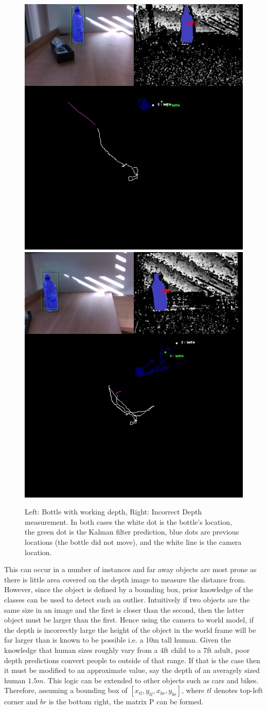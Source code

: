 \documentclass[11pt,twoside]{report}
\begin{document}
\noindent \begin{figure}[h!]
	\includegraphics[width = 0.5\hsize]{figures/bottle2.jpg}
	\includegraphics[width = 0.5\hsize]{figures/bottle1.jpg}
	\caption{Left: Bottle with working depth, Right: Incorrect Depth measurement. In both cases the white dot is the bottle's location, the green dot is the Kalman filter prediction, blue dots are previous locations (the bottle did not move), and the white line is the camera location.}
	\label{bottle}
\end{figure}

This can occur in a number of instances and far away objects are most prone as there is little area covered on the depth image to measure the distance from. However, since the object is defined by a bounding box, prior knowledge of the classes can be used to detect such an outlier. Intuitively if two objects are the same size in an image and the first is closer than the second, then the latter object must be larger than the first. Hence using the camera to world model, if the depth is incorrectly large the height of the object in the world frame will be far larger than is known to be possible i.e. a 10m tall human.
\newline\newline
Given the knowledge that human sizes roughly vary from a 4ft child to a 7ft adult, poor depth predictions convert people to outside of that range. If that is the case then it must be modified to an approximate value, say the depth of an averagely sized human $1.5m$. This logic can be extended to other objects such as cars and bikes. Therefore, assuming a bounding box of $[x_{tl},y_{tl},x_{br},y_{br}]$, where $tl$ denotes top-left corner and $br$ is the bottom right, the matrix P can be formed.
\end{document}
